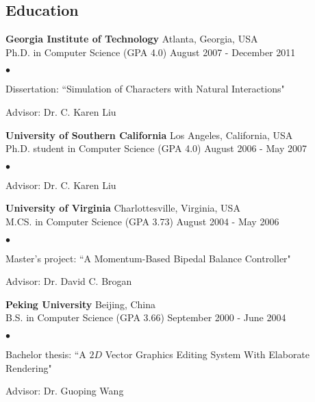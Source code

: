 \documentclass[margin,line]{res}
\newenvironment{list2}{
  \begin{list}{$\bullet$}{%
      \setlength{\itemsep}{0in}
      \setlength{\parsep}{0in} \setlength{\parskip}{0in}
      \setlength{\topsep}{0in} \setlength{\partopsep}{0in} 
      \setlength{\leftmargin}{0.2in}}}{\end{list}}
\begin{document}
\begin{resume}
\section{\sc Education}
{\bf Georgia Institute of Technology} \hfill Atlanta, Georgia, USA\\ 
Ph.D. in Computer Science (GPA 4.0) \hfill August 2007 - December 2011 \\
\begin{list2}
\vspace*{-.15in}
\item Dissertation: ``Simulation of Characters with Natural Interactions"
\item Advisor:  Dr. C. Karen Liu
\end{list2}

\vspace*{-.1in}
{\bf University of Southern California} \hfill Los Angeles, California, USA\\
Ph.D. student in Computer Science (GPA 4.0) \hfill August 2006 - May 2007 \\
\begin{list2}
\vspace*{-.15in}
\item Advisor: Dr. C. Karen Liu
\end{list2}

\vspace*{-.1in}
{\bf University of Virginia} \hfill Charlottesville, Virginia, USA\\
M.CS. in Computer Science (GPA 3.73) \hfill August 2004 - May 2006 \\
\begin{list2}
\vspace*{-.15in}
\item Master's project: ``A Momentum-Based Bipedal Balance Controller"
\item Advisor: Dr. David C. Brogan
\end{list2}

\vspace*{-.1in}
{\bf Peking University} \hfill Beijing, China\\
B.S. in Computer Science (GPA 3.66) \hfill September 2000 - June 2004 \\
\begin{list2}
\vspace*{-.15in}
\item Bachelor thesis: ``A $2D$ Vector Graphics Editing System With Elaborate Rendering"
\item Advisor: Dr. Guoping Wang
\end{list2}



\end{resume}
\end{document}
